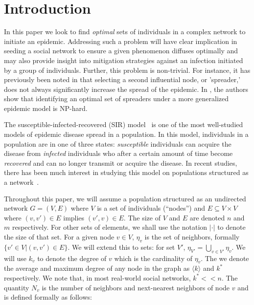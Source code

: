 


\section*{Introduction}

In this paper we look to find \textit{optimal} sets of individuals in a complex network to initiate an epidemic.  Addressing such a problem will have clear implication in seeding a social network to ensure a given phenomenon diffuses optimally and may also provide insight into mitigation strategies against an infection initiated by a group of individuals.  Further, this problem is non-trivial.  For instance, it has previously been noted in  \cite{kitsak10} that selecting a second influential node, or 'spreader,' does not always significantly increase the spread of the epidemic.  In \cite{kleinberg}, the authors show that identifying an optimal set of spreaders under a more generalized epidemic model is NP-hard.

The susceptible-infected-recovered (SIR) model~\cite{anderson79} is one of the most well-studied models of epidemic disease spread in a population.  In this model, individuals in a population are in one of three states: \textit{susceptible} individuals can acquire the disease from \textit{infected} individuals who after a certain amount of time become \textit{recovered} and can no longer transmit or acquire the disease.  In recent studies, there has been much interest in studying this model on populations structured as a network~\cite{easley2010,klemm12, castellano12}.  

Throughout this paper, we will assume a population structured as an undirected network $G=(V,E)$ where $V$ is a set of individuals (``nodes'') and $E \subseteq V \times V$ where $(v,v') \in E$ implies $(v',v) \in E$.  The size of $V$ and $E$ are denoted $n$ and $m$ respectively.  For other sets of elements, we shall use the notation $|\cdot|$ to denote the size of that set.  For a given node $v \in V$, $\eta_v$ is the set of neighbors, formally $\{ v' \in V | (v,v') \in E\}$.  We will extend this to sets: for set $V'$, $\eta_{V'} = \bigcup_{v \in V'}\eta_v$.  We will use $k_v$ to denote the degree of $v$ which is the cardinality of $\eta_v$.  The we denote the average and maximum degree of any node in the graph as $\langle k\rangle$ and $k^*$ respectively.  We note that, in most real-world social networks, $k^* << n$.  The quantity $N_v$ is the number of neighbors and next-nearest neighbors of node $v$ and is defined formally as follows:

